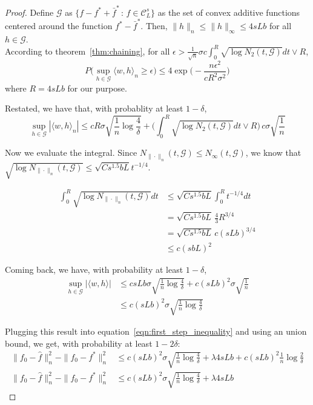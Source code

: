 \begin{proof}
Define $\mathcal{G}$ as $\{ f - f^* + \bar{f}^* \,:\, f \in \mathcal{C}^s_L\}$ as the set of convex additive functions centered around the function $f^* - \bar{f}^*$. Then, $\| h \|_n \leq \| h \|_\infty \leq 4sLb$ for all $h \in \mathcal{G}$.\\

According to theorem~\ref{thm:chaining}, for all $\epsilon > \frac{1}{\sqrt{n}}\sigma c \int_0^R \sqrt{ \log N_2(t, \mathcal{G}) }dt \vee R$,
\[
P\Big( \sup_{h \in \mathcal{G}} \langle w, h \rangle_n \geq \epsilon \Big) \leq
  4 \exp \Big( - \frac{ n \epsilon^2}{ c R^2 \sigma^2} \Big)
\]
where $R = 4sLb$ for our purpose.

Restated, we have that, with probablity at least $1-\delta$,
\[
\sup_{h \in \mathcal{G}} | \langle w, h \rangle_n | \leq 
   c R \sigma \sqrt{ \frac{1}{n} \log \frac{4}{\delta}} + 
      \Big( \int_0^R \sqrt{\log N_2(t, \mathcal{G})}dt \vee R \Big)\, 
       c \sigma \sqrt{\frac{1}{n}} 
\]

Now we evaluate the integral. Since $N_{\|\cdot\|_n}(t, \mathcal{G}) \leq N_\infty(t, \mathcal{G})$, we know that $\sqrt{\log N_{\|\cdot\|_n}(t, \mathcal{G})} \leq \sqrt{C s^{1.5} b L} t^{-1/4}$.

\begin{align*}
\int_0^R \sqrt{\log N_{\|\cdot\|_n}(t, \mathcal{G})} dt &\leq 
      \sqrt{C s^{1.5} b L} \int_0^R t^{-1/4} dt \\ 
 &= \sqrt{C s^{1.5} b L} \, \frac{4}{3} R^{3/4} \\
 &= \sqrt{C s^{1.5} b L} \, c (sLb)^{3/4} \\
 &\leq c (s b L)^2
\end{align*}

Coming back, we have, with probability at least $1-\delta$,
\begin{align*}
\sup_{h \in \mathcal{G}} | \langle w, h \rangle | &\leq 
   c sLb \sigma \sqrt{ \frac{1}{n} \log \frac{4}{\delta} } + 
    c (sLb)^2 \sigma \sqrt{ \frac{1}{n} } \\
 &\leq c (sLb)^2\sigma \sqrt{ \frac{1}{n} \log \frac{4}{\delta} }
\end{align*}

Plugging this result into equation~\ref{eqn:first_step_inequality} and using an union bound, we get, with probability at least $1 - 2\delta$:
\begin{align}
\|f_0 - \hat{f} \|_n^2 - \| f_0 - f^* \|_n^2 
   &\leq c (sLb)^2 \sigma \sqrt{\frac{1}{n} \log \frac{4}{\delta}} 
   + \lambda 4 s L b + c (sLb)^2 \frac{1}{n} \log \frac{2}{\delta} \nonumber\\
\|f_0 - \hat{f} \|_n^2 - \| f_0 - f^* \|_n^2 
   &\leq c (sLb)^2 \sigma \sqrt{\frac{1}{n} \log \frac{4}{\delta}} 
   + \lambda 4 s L b    \label{eqn:second_step_inequality}
\end{align}


\end{proof}
